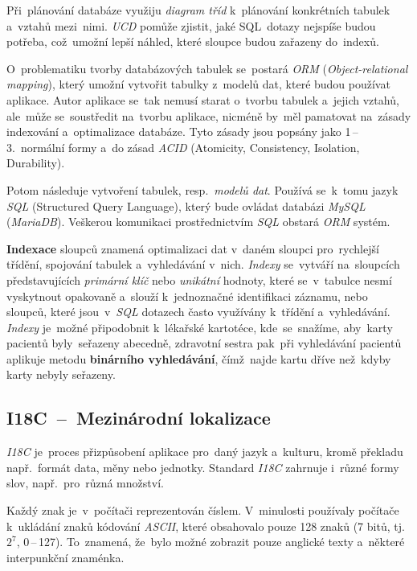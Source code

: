 \documentclass[10pt,a4paper]{article}
\begin{document}
            Při~plánování databáze využiju \emph{diagram tříd} k~plánování konkrétních tabulek a~vztahů mezi~nimi. \emph{UCD} pomůže zjistit, jaké SQL~dotazy nejspíše budou potřeba, což~umožní lepší náhled, které sloupce budou zařazeny do~indexů.

            O~problematiku tvorby databázových tabulek se~postará \emph{ORM} (\emph{Object-relational mapping}), který umožní vytvořit tabulky z~modelů dat, které budou používat aplikace. Autor aplikace se~tak nemusí starat o~tvorbu tabulek a~jejich vztahů, ale~může se~soustředit na~tvorbu aplikace, nicméně by~měl pamatovat na~zásady indexování a~optimalizace databáze. Tyto zásady jsou popsány jako 1\,--\,3.~normální formy a~do zásad \emph{ACID} (Atomicity, Consistency, Isolation, Durability). \cite{interval:normalniformydb, bmcACIDExplained}

            Potom následuje vytvoření tabulek, resp.~\emph{modelů dat}. Používá se~k~tomu jazyk \emph{SQL} (Structured Query Language), který bude ovládat databázi \emph{MySQL} (\emph{MariaDB}). Veškerou komunikaci prostřednictvím \emph{SQL} obstará \emph{ORM} systém.

            \textbf{Indexace} sloupců znamená optimalizaci dat v~daném sloupci pro~rychlejší třídění, spojování tabulek a~vyhledávání v~nich. \emph{Indexy} se~vytváří na~sloupcích představujících \emph{primární klíč} nebo \emph{unikátní} hodnoty, které se~v~tabulce nesmí vyskytnout opakovaně a~slouží k~jednoznačné identifikaci záznamu, nebo sloupců, které jsou~v~\emph{SQL} dotazech často využívány k~třídění a~vyhledávání. \emph{Indexy} je~možné připodobnit k~lékařské kartotéce, kde~se~snažíme, aby~karty pacientů byly~seřazeny abecedně, zdravotní sestra pak~při vyhledávání pacientů aplikuje metodu \textbf{binárního vyhledávání}, čímž~najde kartu dříve než~kdyby karty nebyly seřazeny. \cite{interval:normalniformydb, laurencik2018sql}

        \subsection{I18C~--~Mezinárodní lokalizace}
            \emph{I18C} je~proces přizpůsobení aplikace pro~daný jazyk a~kulturu, kromě překladu např.~formát data, měny nebo jednotky. Standard \emph{I18C} zahrnuje i~různé formy slov, např.~pro~různá množství. \cite{w3Internationalization}

            Každý znak je~v~počítači reprezentován číslem. V~minulosti používaly počítače k~ukládání znaků kódování \emph{ASCII}, které obsahovalo pouze 128 znaků (7 bitů, tj.~$2^7$, 0\,--\,127). To~znamená, že~bylo možné zobrazit pouze anglické texty a~některé interpunkční znaménka. 
            
\end{document}
